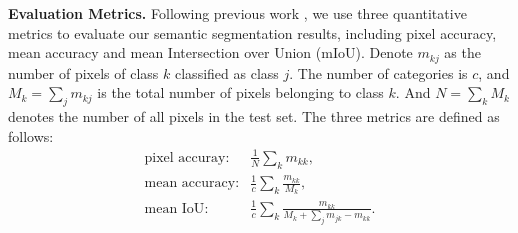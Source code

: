 \noindent\textbf{Evaluation Metrics.}  
Following previous work
\cite{Eigen2015,Gupta2014,Kendall2015,Lin2016,Lin2017,Li2016,Cheng2017,Park2017,Xu2018,Zhang2018,Jiao2018}, we use three quantitative metrics to evaluate our semantic segmentation results, including pixel accuracy, mean accuracy and mean Intersection over Union (mIoU). 
Denote $m_{kj}$ as the number of pixels of class ${k}$ classified as class ${j}$.
The number of categories is $c$, and $M_{k} = \sum_{j}m_{kj}$ is the total number of pixels belonging to class $k$. 
%
And $N = \sum_{k}M_{k}$ denotes the number of all pixels in the test set.
%
The three metrics are defined as follows:
\begin{equation}\label{eq:metric}
\begin{array}{rl}
\text{pixel accuray}: &  \frac{1}{N}\sum_{k}m_{kk}, \\
\text{mean accuracy}: &\frac{1}{c}\sum_{k}\frac{m_{kk}}{M_{k}}, \\
\text{mean IoU}: &\frac{1}{c}\sum_{k}\frac{m_{kk}}{ M_{k}+\sum_{j}m_{jk}-m_{kk}}.
\end{array}
\end{equation}

